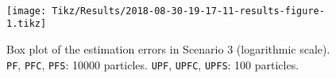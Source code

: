 %


\paragraph{}



\begin{figure}[h!]
	\centering
	\setlength\figureheight{0.8\textheight} 	
	\setlength{}		
	\texttt{[image: Tikz/Results/2018-08-30-19-17-11-results-figure-1.tikz]}			
	\caption[Box plot of the estimation errors in Scenario 3. \texttt{PF}, \texttt{PFC}, \texttt{PFS}: 10000 particles. \texttt{UPF}, \texttt{UPFC}, \texttt{UPFS}: 100 particles.]{Box plot of the estimation errors in Scenario 3 (logarithmic scale). \texttt{PF}, \texttt{PFC}, \texttt{PFS}: 10000 particles. \texttt{UPF}, \texttt{UPFC}, \texttt{UPFS}: 100 particles.}
	\label{fig:2018-08-30-19-17-11-results-figure-1}			
\end{figure}

